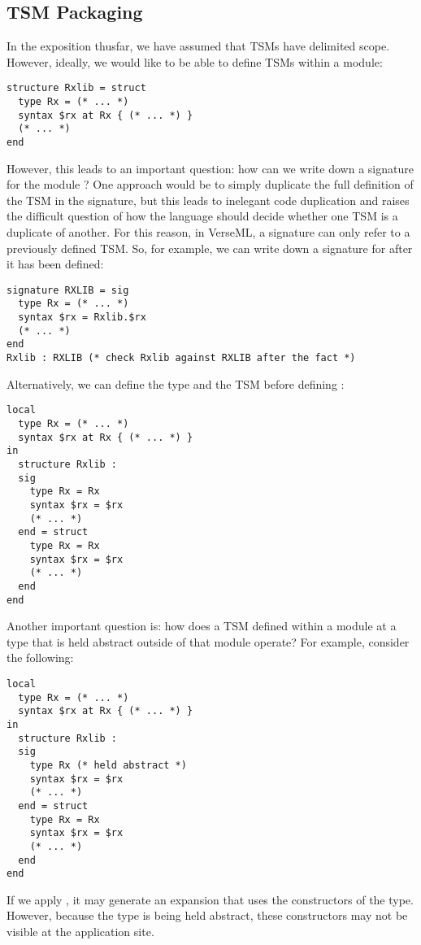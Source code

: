 {\subsection{TSM Packaging}\label{sec:tsm-packaging}

In the exposition thusfar, we have assumed that TSMs have delimited scope. However, ideally, we would like to be able to define TSMs within a module:
\begin{lstlisting}[numbers=none]
structure Rxlib = struct 
  type Rx = (* ... *)
  syntax $rx at Rx { (* ... *) }
  (* ... *)
end
\end{lstlisting}
However, this leads to an important question: how can we write down a signature for the module ? One approach would be to simply duplicate the full definition of the TSM in the signature, but this leads to inelegant code duplication and raises the difficult question of how the language should decide whether one TSM is a duplicate of another. For this reason, in VerseML, a signature can only refer to a previously defined TSM. So, for example, we can write down a signature for  after it has been defined:

\begin{lstlisting}[numbers=none]
signature RXLIB = sig 
  type Rx = (* ... *)
  syntax $rx = Rxlib.$rx
  (* ... *)
end
Rxlib : RXLIB (* check Rxlib against RXLIB after the fact *)
\end{lstlisting}

Alternatively, we can define the type  and the TSM  before defining :
\begin{lstlisting}[numbers=none]
local 
  type Rx = (* ... *)
  syntax $rx at Rx { (* ... *) }
in 
  structure Rxlib : 
  sig 
    type Rx = Rx
    syntax $rx = $rx
    (* ... *)
  end = struct 
    type Rx = Rx 
    syntax $rx = $rx
    (* ... *)
  end
end 
\end{lstlisting}

Another important question is: how does a TSM defined within a module at a type that is held abstract outside of that module operate? For example, consider the following:
\begin{lstlisting}[numbers=none]
local 
  type Rx = (* ... *)
  syntax $rx at Rx { (* ... *) }
in 
  structure Rxlib : 
  sig 
    type Rx (* held abstract *)
    syntax $rx = $rx
    (* ... *)
  end = struct 
    type Rx = Rx
    syntax $rx = $rx
    (* ... *)
  end
end 
\end{lstlisting}
If we apply , it may generate an expansion that uses the constructors of the  type. However, because the type is being held abstract, these constructors may not be visible at the application site. 

}
